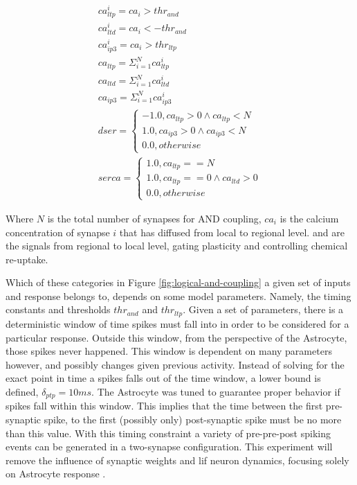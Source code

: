 \begin{align}
  ca^i_{ltp} = ca_i > thr_{and} \label{eq:ca_and_ltp} \\
  ca^i_{ltd} = ca_i < -thr_{and} \\
  ca^i_{ip3} = ca_i > thr_{ltp} \\
  ca_{ltp} = \Sigma_{i=1}^N ca_{ltp}^i \\
  ca_{ltd} = \Sigma_{i=1}^N ca_{ltd}^i \\
  ca_{ip3} = \Sigma_{i=1}^N ca_{ip3}^i \\
  dser =
  \begin{cases} 
    -1.0, ca_{ltp} > 0 \land ca_{ltp} < N \\
    1.0, ca_{ip3} > 0 \land ca_{ip3} < N \\
    0.0, otherwise
  \end{cases} \label{eq:dser_cases} \\
  serca =
  \begin{cases}
    1.0, ca_{ltp} == N \\
    1.0, ca_{ltp} == 0 \land ca_{ltd} > 0 \\
    0.0, otherwise 
  \end{cases} \label{eq:serca_cases}
\end{align}

Where $N$ is the total number of synapses for AND coupling, $ca_i$ is the
calcium concentration of synapse $i$ that has diffused from local to regional
level. \dser and \serca are the signals from regional to local level, gating
plasticity and controlling chemical re-uptake.

Which of these categories in Figure \ref{fig:logical-and-coupling} a given set
of inputs and response belongs to, depends on some model parameters. Namely,
the timing constants and thresholds $thr_{and}$ and $thr_{ltp}$. Given a
set of parameters, there is a deterministic window of time spikes must fall into
in order to be considered for a particular response. Outside this window, from
the perspective of the Astrocyte, those spikes never happened. This window is
dependent on many parameters however, and possibly changes given previous
activity. Instead of solving for the exact point in time a spikes falls out of
the time window, a lower bound is defined, $\delta_{ptp}=10ms$. The Astrocyte
was tuned to guarantee proper behavior if spikes fall within this
window. This implies that the time between the first pre-synaptic spike, to the
first (possibly only) post-synaptic spike must be no more than this value. With
this timing constraint a variety of pre-pre-post spiking events can be generated
in a two-synapse configuration. This experiment will remove the influence of
synaptic weights and \Gls{lif} neuron dynamics, focusing solely on Astrocyte
response \ca.

